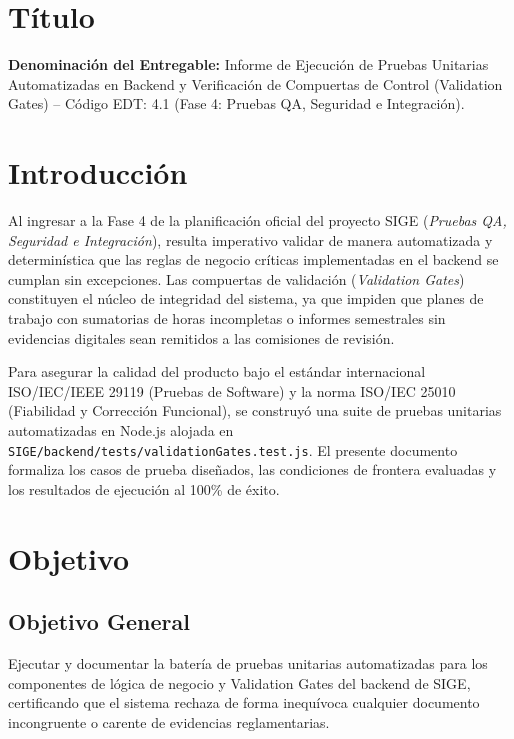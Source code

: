 \documentclass[12pt,a4paper]{article}
\begin{document}

\vspace{0.25cm}

\section{Título}
\textbf{Denominación del Entregable:} Informe de Ejecución de Pruebas Unitarias Automatizadas en Backend y Verificación de Compuertas de Control (Validation Gates) -- Código EDT: 4.1 (Fase 4: Pruebas QA, Seguridad e Integración).

\section{Introducción}
Al ingresar a la Fase 4 de la planificación oficial del proyecto SIGE (\textit{Pruebas QA, Seguridad e Integración}), resulta imperativo validar de manera automatizada y determinística que las reglas de negocio críticas implementadas en el backend se cumplan sin excepciones. Las compuertas de validación (\textit{Validation Gates}) constituyen el núcleo de integridad del sistema, ya que impiden que planes de trabajo con sumatorias de horas incompletas o informes semestrales sin evidencias digitales sean remitidos a las comisiones de revisión.

Para asegurar la calidad del producto bajo el estándar internacional ISO/IEC/IEEE 29119 (Pruebas de Software) y la norma ISO/IEC 25010 (Fiabilidad y Corrección Funcional), se construyó una suite de pruebas unitarias automatizadas en Node.js alojada en \texttt{SIGE/backend/tests/validationGates.test.js}. El presente documento formaliza los casos de prueba diseñados, las condiciones de frontera evaluadas y los resultados de ejecución al 100\% de éxito.

\section{Objetivo}

\subsection{Objetivo General}
Ejecutar y documentar la batería de pruebas unitarias automatizadas para los componentes de lógica de negocio y Validation Gates del backend de SIGE, certificando que el sistema rechaza de forma inequívoca cualquier documento incongruente o carente de evidencias reglamentarias.
\end{document}
